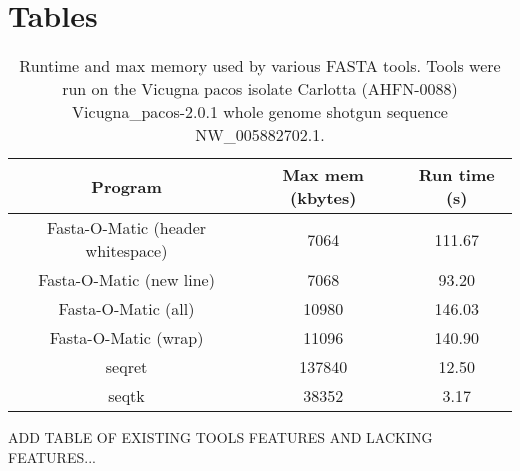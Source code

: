 \section*{Tables}
\begin{table} 
    \begin{tabular}{ c c c }
        Program & Max mem (kbytes) & Run time (s) \\ \hline
        Fasta-O-Matic (header whitespace) & 7064 & 111.67 \\ 
        Fasta-O-Matic (new line) & 7068 & 93.20 \\ 
        Fasta-O-Matic (all) & 10980 & 146.03 \\ 
        Fasta-O-Matic (wrap) & 11096 & 140.90 \\ 
        seqret & 137840 & 12.50 \\ 
        seqtk & 38352 & 3.17 \\ 
    \end{tabular} 
    \caption{Runtime and max memory used by various FASTA tools. Tools were run on the Vicugna pacos isolate Carlotta (AHFN-0088) Vicugna_pacos-2.0.1 whole genome shotgun sequence NW_005882702.1.} 
\end{table}

ADD TABLE OF EXISTING TOOLS FEATURES AND LACKING FEATURES...

  
  
  
  
  